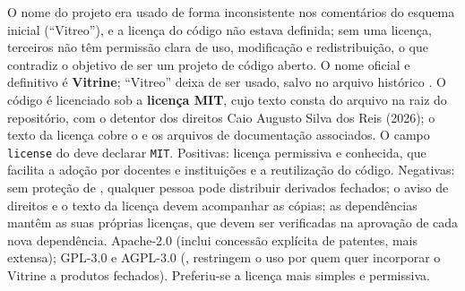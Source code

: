 {O nome do projeto era usado de forma inconsistente nos comentários do esquema inicial (``Vitreo''), e a licença do código não estava definida; sem uma licença, terceiros não têm permissão clara de uso, modificação e redistribuição, o que contradiz o objetivo de ser um projeto de código aberto.}
{O nome oficial e definitivo é \textbf{Vitrine}; ``Vitreo'' deixa de ser usado, salvo no arquivo histórico . O código é licenciado sob a \textbf{licença MIT}, cujo texto consta do arquivo  na raiz do repositório, com o detentor dos direitos Caio Augusto Silva dos Reis (2026); o texto da licença cobre o  e os arquivos de documentação associados. O campo \texttt{license} do  deve declarar \texttt{MIT}.}
{Positivas: licença permissiva e conhecida, que facilita a adoção por docentes e instituições e a reutilização do código. Negativas: sem proteção de , qualquer pessoa pode distribuir derivados fechados; o aviso de direitos e o texto da licença devem acompanhar as cópias; as dependências mantêm as suas próprias licenças, que devem ser verificadas na aprovação de cada nova dependência.}
{Apache-2.0 (inclui concessão explícita de patentes, mais extensa); GPL-3.0 e AGPL-3.0 (, restringem o uso por quem quer incorporar o Vitrine a produtos fechados). Preferiu-se a licença mais simples e permissiva.}

